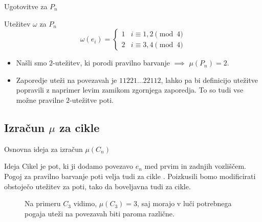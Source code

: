 \documentclass{beamer}
\begin{document}
\begin{frame}{Ugotovitve za $P_n$}
	\begin{block}{Utežitev $\omega$ za $P_n$}
		$$
		\omega(e_i) = \begin{cases}
			1 &i \equiv 1,2 \pmod{4}\\ 
			2 &i \equiv 3,4 \pmod{4}
		\end{cases}
		$$
	\end{block}
	\begin{itemize}
		\item Našli smo $2$-utežitev, ki porodi pravilno barvanje $\implies$  $\mu(P_n) = 2$.
		\item Zaporedje uteži na povezavah je $11221\ldots 22112$, lahko pa bi definicijo utežitve popravili z naprimer levim zamikom zgornjega zaporedja. To so tudi vse možne pravilne $2$-utežitve poti.
	\end{itemize}
\end{frame}

\subsection{Izračun $\mu$ za cikle}
\begin{frame}{Osnovna ideja za izračun $\mu(C_n)$}
	\begin{block}{Ideja}
		Cikel je pot, ki ji dodamo povezavo $e_n$ med prvim in zadnjih vozliščem. Pogoj za pravilno barvanje poti velja tudi za cikle . Poizkusili bomo modificirati obstoječo utežitev za poti, tako da boveljavna tudi za cikle.
	\end{block}

\begin{figure}
	\caption{Na primeru $C_3$ vidimo, $\mu(C_3) = 3$, saj morajo v luči potrebnega pogaja uteži na povezavah biti paroma različne.}
\end{figure}
\end{frame}
\end{document}
